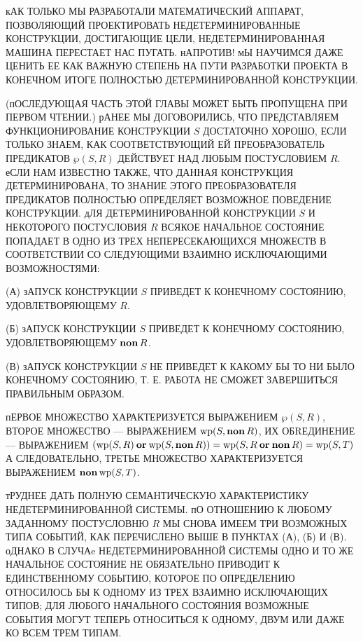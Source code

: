 кАК ТОЛЬКО МЫ РАЗРАБОТАЛИ МАТЕМАТИЧЕСКИЙ АППАРАТ, ПОЗВОЛЯЮЩИЙ 
ПРОЕКТИРОВАТЬ НЕДЕТЕРМИНИРОВАННЫЕ КОНСТРУКЦИИ, ДОСТИГАЮЩИЕ ЦЕЛИ, 
НЕДЕТЕРМИНИРОВАННАЯ МАШИНА ПЕРЕСТАЕТ НАС ПУГАТЬ. нАПРОТИВ! мЫ НАУЧИМСЯ 
ДАЖЕ ЦЕНИТЬ ЕЕ КАК ВАЖНУЮ СТЕПЕНЬ НА ПУТИ РАЗРАБОТКИ ПРОЕКТА В КОНЕЧНОМ 
ИТОГЕ ПОЛНОСТЬЮ ДЕТЕРМИНИРОВАННОЙ КОНСТРУКЦИИ.

(пОСЛЕДУЮЩАЯ ЧАСТЬ ЭТОЙ ГЛАВЫ МОЖЕТ БЫТЬ ПРОПУЩЕНА ПРИ ПЕРВОМ ЧТЕНИИ.) 
рАНЕЕ МЫ ДОГОВОРИЛИСЬ, ЧТО ПРЕДСТАВЛЯЕМ ФУНКЦИОНИРОВАНИЕ КОНСТРУКЦИИ $S$ 
ДОСТАТОЧНО ХОРОШО, ЕСЛИ ТОЛЬКО ЗНАЕМ, КАК СООТВЕТСТВУЮЩИЙ ЕЙ 
ПРЕОБРАЗОВАТЕЛЬ ПРЕДИКАТОВ $\wp(S,R)$ ДЕЙСТВУЕТ НАД ЛЮБЫМ ПОСТУСЛОВИЕМ 
$R$. еСЛИ НАМ ИЗВЕСТНО ТАКЖЕ, ЧТО ДАННАЯ КОНСТРУКЦИЯ ДЕТЕРМИНИРОВАНА, ТО 
ЗНАНИЕ ЭТОГО ПРЕОБРАЗОВАТЕЛЯ ПРЕДИКАТОВ ПОЛНОСТЬЮ ОПРЕДЕЛЯЕТ ВОЗМОЖНОЕ 
ПОВЕДЕНИЕ КОНСТРУКЦИИ. дЛЯ ДЕТЕРМИНИРОВАННОЙ КОНСТРУКЦИИ $S$ И 
НЕКОТОРОГО ПОСТУСЛОВИЯ $R$ ВСЯКОЕ НАЧАЛЬНОЕ СОСТОЯНИЕ ПОПАДАЕТ В ОДНО ИЗ 
ТРЕХ НЕПЕРЕСЕКАЮЩИХСЯ МНОЖЕСТВ В СООТВЕТСТВИИ СО СЛЕДУЮЩИМИ ВЗАИМНО 
ИСКЛЮЧАЮЩИМИ ВОЗМОЖНОСТЯМИ:

(А) зАПУСК КОНСТРУКЦИИ $S$ ПРИВЕДЕТ К КОНЕЧНОМУ СОСТОЯНИЮ, 
УДОВЛЕТВОРЯЮЩЕМУ $R$.

(Б) зАПУСК КОНСТРУКЦИИ $S$ ПРИВЕДЕТ К КОНЕЧНОМУ СОСТОЯНИЮ, 
УДОВЛЕТВОРЯЮЩЕМУ $\mathop{\bf non}\nolimits R$.

(В) зАПУСК КОНСТРУКЦИИ $S$ НЕ ПРИВЕДЕТ К КАКОМУ БЫ ТО НИ БЫЛО КОНЕЧНОМУ 
СОСТОЯНИЮ, Т. Е. РАБОТА НЕ СМОЖЕТ ЗАВЕРШИТЬСЯ ПРАВИЛЬНЫМ ОБРАЗОМ.

пЕРВОЕ МНОЖЕСТВО ХАРАКТЕРИЗУЕТСЯ ВЫРАЖЕНИЕМ $\wp(S, R)$, ВТОРОЕ 
МНОЖЕСТВО --- ВЫРАЖЕНИЕМ $\mathop{\rm wp}\nolimits(S, \mathop{\bf non}\nolimits R)$, ИХ ОБRЕДИНЕНИЕ --- 
ВЫРАЖЕНИЕМ $(\mathop{\rm wp}\nolimits(S,R)\mathbin{\bf or}\mathop{\rm wp}\nolimits(S,\mathop{\bf non}\nolimits R))=\mathop{\rm wp}\nolimits(S,R\mathbin{\bf or}\mathop{\bf non}\nolimits R)=\mathop{\rm wp}\nolimits(S,T)$
А СЛЕДОВАТЕЛЬНО, ТРЕТЬЕ МНОЖЕСТВО ХАРАКТЕРИЗУЕТСЯ ВЫРАЖЕНИЕМ 
$\mathop{\bf non}\nolimits\mathop{\rm wp}\nolimits(S,T)$.

тРУДНЕЕ ДАТЬ ПОЛНУЮ СЕМАНТИЧЕСКУЮ ХАРАКТЕРИСТИКУ НЕДЕТЕРМИНИРОВАННОЙ 
СИСТЕМЫ. пО ОТНОШЕНИЮ К ЛЮБОМУ ЗАДАННОМУ ПОСТУСЛОВНЮ $R$ МЫ СНОВА ИМЕЕМ 
ТРИ ВОЗМОЖНЫХ ТИПА СОБЫТИЙ, КАК ПЕРЕЧИСЛЕНО ВЫШЕ В ПУНКТАХ (А), (Б) И 
(В). оДНАКО В СЛУЧАe НЕДЕТЕРМИНИРОВАННОЙ СИСТЕМЫ ОДНО И ТО ЖЕ НАЧАЛЬНОЕ 
СОСТОЯНИЕ НЕ ОБЯЗАТЕЛЬНО ПРИВОДИТ К ЕДИНСТВЕННОМУ СОБЫТИЮ, КОТОРОЕ ПО 
ОПРЕДЕЛЕНИЮ ОТНОСИЛОСЬ БЫ К ОДНОМУ ИЗ ТРЕХ ВЗАИМНО ИСКЛЮЧАЮЩИХ ТИПОВ; 
ДЛЯ ЛЮБОГО НАЧАЛЬНОГО СОСТОЯНИЯ ВОЗМОЖНЫЕ СОБЫТИЯ МОГУТ ТЕПЕРЬ 
ОТНОСИТЬСЯ К ОДНОМУ, ДВУМ ИЛИ ДАЖЕ КО ВСЕМ ТРЕМ ТИПАМ.

